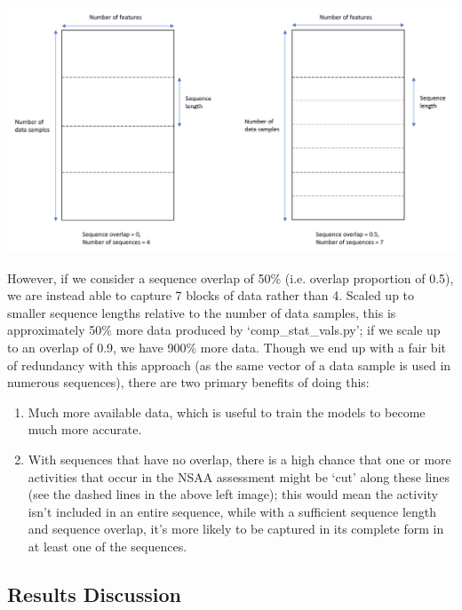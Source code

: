 \documentclass[12pt,twoside]{report}
\begin{document}
\begin{center}
\includegraphics[scale=0.2]{project_figures/fig10_11}
\end{center}

\quad However, if we consider a sequence overlap of 50\% (i.e. overlap proportion of 0.5), we are instead able to capture 7 blocks of data rather than 4. Scaled up to smaller sequence lengths relative to the number of data samples, this is approximately 50\% more data produced by ‘comp\_stat\_vals.py’; if we scale up to an overlap of 0.9, we have 900\% more data. Though we end up with a fair bit of redundancy with this approach (as the same vector of a data sample is used in numerous sequences), there are two primary benefits of doing this:

\begin{enumerate}
	\item Much more available data, which is useful to train the models to become much more accurate.
	\item With sequences that have no overlap, there is a high chance that one or more activities that occur in the NSAA assessment might be ‘cut’ along these lines (see the dashed lines in the above left image); this would mean the activity isn’t included in an entire sequence, while with a sufficient sequence length and sequence overlap, it’s more likely to be captured in its complete form in at least one of the sequences.
\end{enumerate}



\subsection{Results Discussion}
\end{document}

